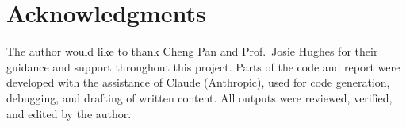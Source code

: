 \section*{Acknowledgments}

The author would like to thank Cheng Pan and Prof.\ Josie Hughes for their guidance and support throughout this project. Parts of the code and report were developed with the assistance of Claude (Anthropic), used for code generation, debugging, and drafting of written content. All outputs were reviewed, verified, and edited by the author.